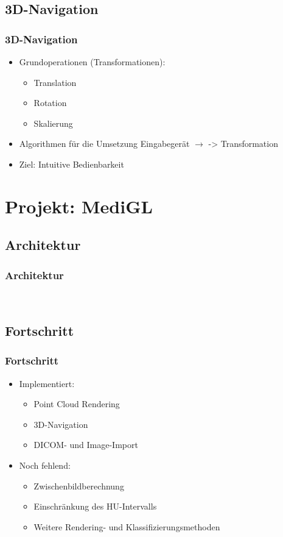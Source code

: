 \documentclass[14pt]{beamer}
\begin{document}
\subsection{3D-Navigation}
\begin{frame}
 \frametitle{3D-Navigation}
 \begin{itemize}
  \item Grundoperationen (Transformationen):
  \begin{itemize}
   \item Translation
   \item Rotation
   \item Skalierung
  \end{itemize}
  \item Algorithmen für die Umsetzung Eingabegerät $\rightarrow$ -> Transformation
  \item Ziel: Intuitive Bedienbarkeit
 \end{itemize}
\end{frame}
%
%
%
\section{Projekt: MediGL}
%
\subsection{Architektur}
\begin{frame}[allowframebreaks]
\frametitle{Architektur}
\\
\end{frame}
%
\subsection{Fortschritt}
\begin{frame}
\frametitle{Fortschritt}
\begin{itemize}
 \item Implementiert:
  \begin{itemize}
   \item Point Cloud Rendering
   \item 3D-Navigation
   \item DICOM- und Image-Import
  \end{itemize}
  \item Noch fehlend:
  \begin{itemize}
   \item Zwischenbildberechnung
   \item Einschränkung des HU-Intervalls
   \item Weitere Rendering- und Klassifizierungsmethoden
  \end{itemize}
\end{itemize}

\end{frame}
%
%
%
\end{document}
